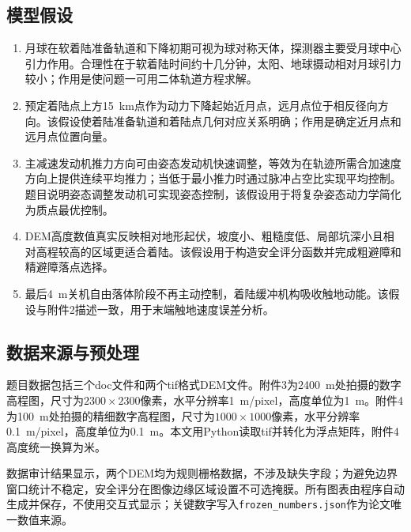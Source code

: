 \documentclass[UTF8,a4paper,12pt]{ctexart}
\begin{document}
\subsection{模型假设}
\begin{enumerate}[label=H\arabic*]
  \item 月球在软着陆准备轨道和下降初期可视为球对称天体，探测器主要受月球中心引力作用。合理性在于软着陆时间约十几分钟，太阳、地球摄动相对月球引力较小；作用是使问题一可用二体轨道方程求解。
  \item 预定着陆点上方\SI{15}{km}点作为动力下降起始近月点，远月点位于相反径向方向。该假设使着陆准备轨道和着陆点几何对应关系明确；作用是确定近月点和远月点位置向量。
  \item 主减速发动机推力方向可由姿态发动机快速调整，等效为在轨迹所需合加速度方向上提供连续平均推力；当低于最小推力时通过脉冲占空比实现平均控制。题目说明姿态调整发动机可实现姿态控制，该假设用于将复杂姿态动力学简化为质点最优控制。
  \item DEM高度数值真实反映相对地形起伏，坡度小、粗糙度低、局部坑深小且相对高程较高的区域更适合着陆。该假设用于构造安全评分函数并完成粗避障和精避障落点选择。
  \item 最后\SI{4}{m}关机自由落体阶段不再主动控制，着陆缓冲机构吸收触地动能。该假设与附件2描述一致，用于末端触地速度误差分析。
\end{enumerate}

\subsection{数据来源与预处理}
题目数据包括三个doc文件和两个tif格式DEM文件。附件3为\SI{2400}{m}处拍摄的数字高程图，尺寸为$2300\times2300$像素，水平分辨率\SI{1}{m/pixel}，高度单位为\SI{1}{m}。附件4为\SI{100}{m}处拍摄的精细数字高程图，尺寸为$1000\times1000$像素，水平分辨率\SI{0.1}{m/pixel}，高度单位为\SI{0.1}{m}。本文用Python读取tif并转化为浮点矩阵，附件4高度统一换算为米。

数据审计结果显示，两个DEM均为规则栅格数据，不涉及缺失字段；为避免边界窗口统计不稳定，安全评分在图像边缘区域设置不可选掩膜。所有图表由程序自动生成并保存，不使用交互式显示；关键数字写入\texttt{frozen\_numbers.json}作为论文唯一数值来源。
\end{document}

